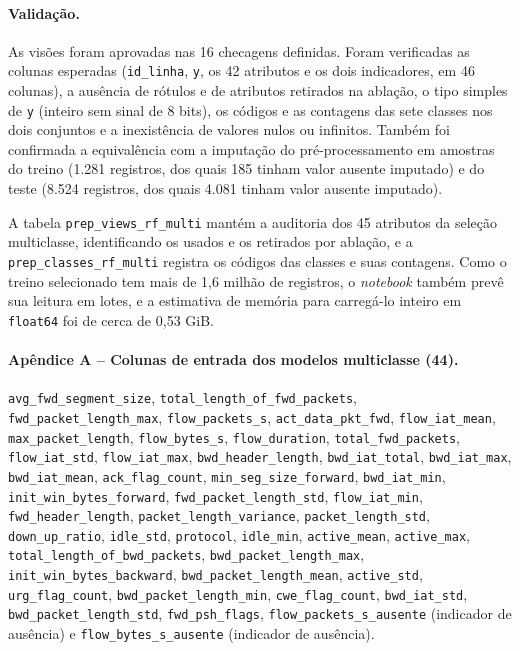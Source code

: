 \documentclass[
    12pt,                %
    openright,           %
    oneside,             %
    a4paper,             %
    english,             %
    brazil               %
]{abntex2}
\begin{document}
\paragraph{Validação.}
As visões foram aprovadas nas 16 checagens definidas. Foram verificadas as colunas esperadas (\texttt{id\_linha}, \texttt{y}, os 42 atributos e os dois indicadores, em 46 colunas), a ausência de rótulos e de atributos retirados na ablação, o tipo simples de \texttt{y} (inteiro sem sinal de 8 bits), os códigos e as contagens das sete classes nos dois conjuntos e a inexistência de valores nulos ou infinitos. Também foi confirmada a equivalência com a imputação do pré-processamento em amostras do treino (1.281 registros, dos quais 185 tinham valor ausente imputado) e do teste (8.524 registros, dos quais 4.081 tinham valor ausente imputado).

A tabela \texttt{prep\_views\_rf\_multi} mantém a auditoria dos 45 atributos da seleção multiclasse, identificando os usados e os retirados por ablação, e a \texttt{prep\_classes\_rf\_multi} registra os códigos das classes e suas contagens. Como o treino selecionado tem mais de 1,6 milhão de registros, o \textit{notebook} também prevê sua leitura em lotes, e a estimativa de memória para carregá-lo inteiro em \texttt{float64} foi de cerca de 0,53 GiB.

\paragraph{Apêndice A -- Colunas de entrada dos modelos multiclasse (44).}

\texttt{avg\_fwd\_segment\_size}, \texttt{total\_length\_of\_fwd\_packets}, \texttt{fwd\_packet\_length\_max}, \texttt{flow\_packets\_s}, \texttt{act\_data\_pkt\_fwd}, \texttt{flow\_iat\_mean}, \texttt{max\_packet\_length}, \texttt{flow\_bytes\_s}, \texttt{flow\_duration}, \texttt{total\_fwd\_packets}, \texttt{flow\_iat\_std}, \texttt{flow\_iat\_max}, \texttt{bwd\_header\_length}, \texttt{bwd\_iat\_total}, \texttt{bwd\_iat\_max}, \texttt{bwd\_iat\_mean}, \texttt{ack\_flag\_count}, \texttt{min\_seg\_size\_forward}, \texttt{bwd\_iat\_min}, \texttt{init\_win\_bytes\_forward}, \texttt{fwd\_packet\_length\_std}, \texttt{flow\_iat\_min}, \texttt{fwd\_header\_length}, \texttt{packet\_length\_variance}, \texttt{packet\_length\_std}, \texttt{down\_up\_ratio}, \texttt{idle\_std}, \texttt{protocol}, \texttt{idle\_min}, \texttt{active\_mean}, \texttt{active\_max}, \texttt{total\_length\_of\_bwd\_packets}, \texttt{bwd\_packet\_length\_max}, \texttt{init\_win\_bytes\_backward}, \texttt{bwd\_packet\_length\_mean}, \texttt{active\_std}, \texttt{urg\_flag\_count}, \texttt{bwd\_packet\_length\_min}, \texttt{cwe\_flag\_count}, \texttt{bwd\_iat\_std}, \texttt{bwd\_packet\_length\_std}, \texttt{fwd\_psh\_flags}, \texttt{flow\_packets\_s\_ausente} (indicador de ausência) e \texttt{flow\_bytes\_s\_ausente} (indicador de ausência).
\end{document}
